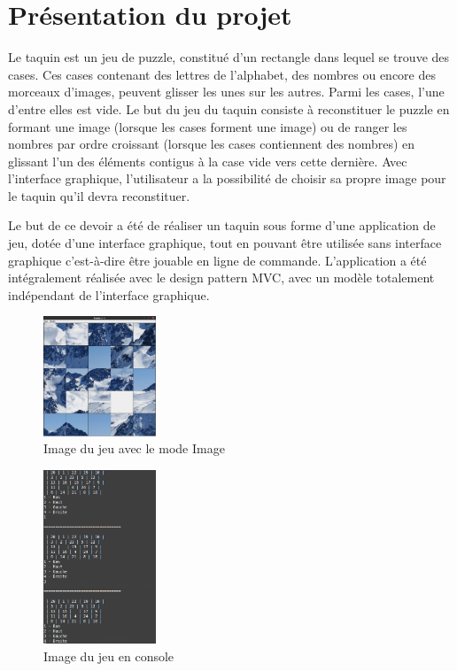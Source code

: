 \chapter{Présentation du projet}

		Le taquin est un jeu de puzzle, constitué d’un rectangle dans lequel se trouve des cases. Ces cases contenant des lettres de l'alphabet, des nombres ou encore des morceaux d’images, peuvent glisser les unes sur les autres. Parmi les cases, l’une d'entre elles est vide. Le but du jeu du taquin consiste à reconstituer le puzzle en formant une image (lorsque les cases forment une image) ou de ranger les nombres par ordre croissant (lorsque les cases contiennent des nombres) en glissant l'un des éléments contigus à la case vide vers cette dernière. Avec l’interface graphique, l'utilisateur a la possibilité de choisir sa propre image pour le taquin qu’il devra reconstituer.

		Le but de ce devoir a été de réaliser un taquin sous forme d’une application de jeu, dotée d'une interface graphique, tout en pouvant être utilisée sans interface graphique c'est-à-dire être jouable en ligne de commande. L'application a été intégralement réalisée avec le design pattern MVC, avec un modèle totalement indépendant de l'interface graphique.

		\begin{figure}[H]
			\centering\includegraphics[width=0.30\textwidth, keepaspectratio]{img/jeuImage.png}
			\caption{Image du jeu avec le mode Image}
			\label{fig:JeuImage}
		\end{figure}

		\begin{figure}[H]
			\centering\includegraphics[width=0.30\textwidth, keepaspectratio]{img/jeuConsole.png}
			\caption{Image du jeu en console}
			\label{fig:JeuConsole}
		\end{figure}
